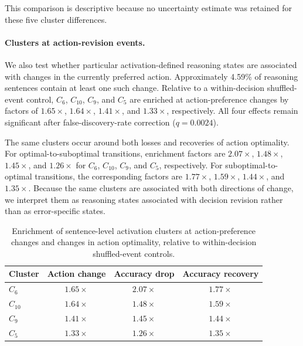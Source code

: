 \documentclass{article}
\begin{document}
This comparison is descriptive because no uncertainty estimate was retained for these five cluster differences.

\paragraph{Clusters at action-revision events.}
We also test whether particular activation-defined reasoning states are
associated with changes in the currently preferred action. Approximately
4.59\% of reasoning sentences contain at least one such change. Relative to
a within-decision shuffled-event control, \(C_6\), \(C_{10}\), \(C_9\), and
\(C_5\) are enriched at action-preference changes by factors of
\(1.65\times\), \(1.64\times\), \(1.41\times\), and \(1.33\times\),
respectively. All four effects remain significant after false-discovery-rate
correction (\(q=0.0024\)).

The same clusters occur around both losses and recoveries of action
optimality. For optimal-to-suboptimal transitions, enrichment factors are
\(2.07\times\), \(1.48\times\), \(1.45\times\), and \(1.26\times\) for
\(C_6\), \(C_{10}\), \(C_9\), and \(C_5\), respectively. For
suboptimal-to-optimal transitions, the corresponding factors are
\(1.77\times\), \(1.59\times\), \(1.44\times\), and \(1.35\times\).
Because the same clusters are associated with both directions of change, we
interpret them as reasoning states associated with decision revision rather
than as error-specific states.

\begin{table}[htbp]
\centering
\small
\begin{tabular}{lccc}
\toprule
Cluster & Action change & Accuracy drop & Accuracy recovery \\
\midrule
\(C_6\)    & \(1.65\times\) & \(2.07\times\) & \(1.77\times\) \\
\(C_{10}\) & \(1.64\times\) & \(1.48\times\) & \(1.59\times\) \\
\(C_9\)    & \(1.41\times\) & \(1.45\times\) & \(1.44\times\) \\
\(C_5\)    & \(1.33\times\) & \(1.26\times\) & \(1.35\times\) \\
\bottomrule
\end{tabular}
\caption{Enrichment of sentence-level activation clusters at
action-preference changes and changes in action optimality, relative to
within-decision shuffled-event controls.}
\label{tab:reasoning-events-app}
\end{table}
\end{document}
